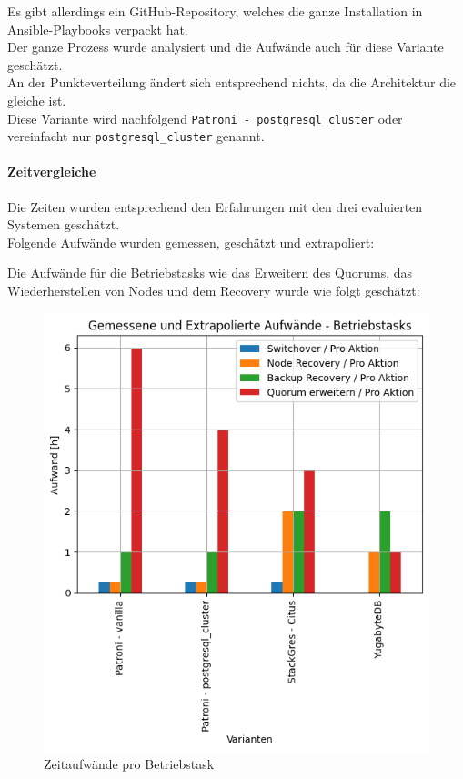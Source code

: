 \begin{flushleft}
    Es gibt allerdings ein \Gls{GitHub}-Repository, welches die ganze Installation in \Gls{Ansible}-Playbooks verpackt hat.\\
    Der ganze Prozess wurde analysiert und die Aufwände auch für diese Variante geschätzt.\\
    An der Punkteverteilung ändert sich entsprechend nichts, da die Architektur die gleiche ist.\\
    Diese Variante wird nachfolgend \texttt{Patroni - postgresql\_cluster} oder vereinfacht nur \texttt{postgresql\_cluster} genannt.
    \paragraph{Zeitvergleiche}
    Die Zeiten wurden entsprechend den Erfahrungen mit den drei evaluierten Systemen geschätzt.\\
    Folgende Aufwände wurden gemessen, geschätzt und extrapoliert:
    
    Die Aufwände für die Betriebstasks wie das Erweitern des Quorums, das Wiederherstellen von Nodes und dem Recovery wurde wie folgt geschätzt:
    \begin{figure}[H]
        \centering
        \includegraphics[width=0.75\linewidth]{source/pandas_data_chart_plotter/time_investment_action}
        \caption{Zeitaufwände pro Betriebstask}
        \label{fig:time_investment_action}
    \end{figure}
\end{flushleft}
